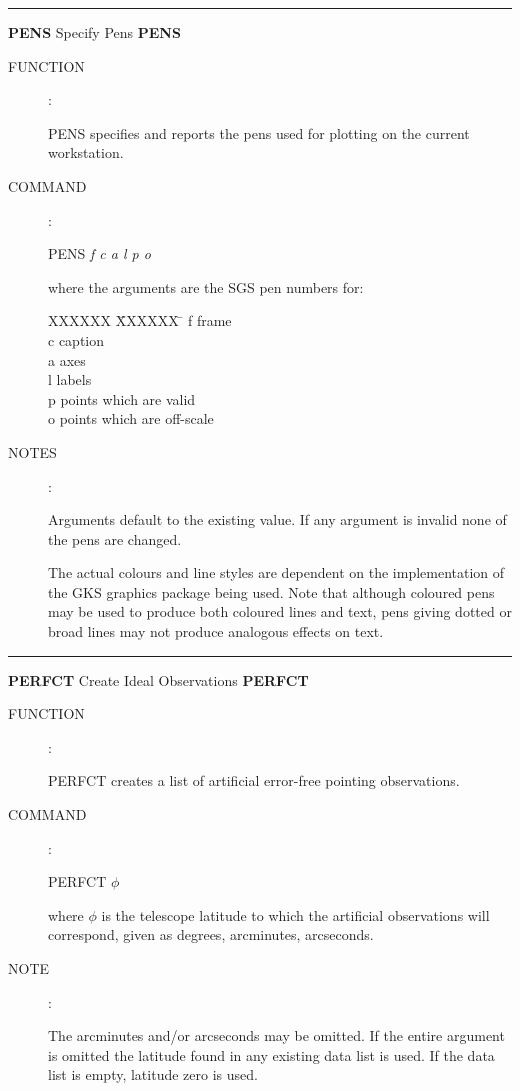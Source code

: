 
\goodbreak
\rule{\textwidth}{0.3mm}
{\Large {\bf PENS} \hfill Specify Pens \hfill {\bf PENS}}
\begin{description}
\item [FUNCTION]:

PENS specifies and reports the pens used for
plotting on the current workstation.

\item [COMMAND]:

\begin{cmd}
\> \> PENS {\it f c a l p o}
\end{cmd}

where the arguments are the SGS pen numbers for:

\begin{tabs}
XXXXXX \= XXXXXX \= \kill
\> f \> frame \\
\> c \> caption \\
\> a \> axes \\
\> l \> labels \\
\> p \> points which are valid \\
\> o \> points which are off-scale
\end{tabs}

\item [NOTES]:

Arguments default to the existing value.  If any argument
is invalid none of the pens are changed.

The actual colours and line styles are dependent on the
implementation of the GKS graphics package being used.
Note that although coloured pens may be used to produce
both coloured lines and text, pens giving dotted or broad
lines may not produce analogous effects on text.

\end{description}


\goodbreak
\rule{\textwidth}{0.3mm}
{\Large {\bf PERFCT} \hfill Create Ideal Observations \hfill {\bf PERFCT}}
\begin{description}
\item [FUNCTION]:

PERFCT creates a list of artificial error-free
pointing observations.

\item [COMMAND]:

\begin{cmd}
\> \> PERFCT $\phi$
\end{cmd}

where $\phi$ is the telescope latitude to which the artificial
observations will correspond, given as degrees, arcminutes,
arcseconds.

\item [NOTE]:

The arcminutes and/or arcseconds may be omitted.  If the
entire argument is omitted
the latitude found in any existing data list
is used.  If the data list is empty, latitude zero is
used.

\end{description}

